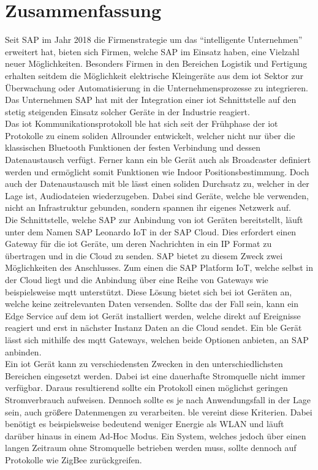 \section{Zusammenfassung}
\label{s:fazit}

\noindent Seit SAP im Jahr 2018 die Firmenstrategie um das "`intelligente Unternehmen"' erweitert hat, bieten sich Firmen, welche SAP im Einsatz haben, eine Vielzahl neuer Möglichkeiten. Besonders Firmen in den Bereichen Logistik und Fertigung erhalten seitdem die Möglichkeit elektrische Kleingeräte aus dem \ac{iot} Sektor zur Überwachung oder Automatisierung in die Unternehmensprozesse zu integrieren. Das Unternehmen SAP hat mit der Integration einer \ac{iot} Schnittstelle auf den stetig steigenden Einsatz solcher Geräte in der Industrie reagiert.\\
\noindent Das \ac{iot} Kommunikationsprotokoll \ac{ble} hat sich seit der Frühphase der \ac{iot} Protokolle zu einem soliden Allrounder entwickelt, welcher nicht nur über die klassischen Bluetooth Funktionen der festen Verbindung und dessen Datenaustausch verfügt. Ferner kann ein \ac{ble} Gerät auch als Broadcaster definiert werden und ermöglicht somit Funktionen wie Indoor Positionsbestimmung. Doch auch der Datenaustausch mit \ac{ble} lässt einen soliden Durchsatz zu, welcher in der Lage ist, Audiodateien wiederzugeben. Dabei sind Geräte, welche \ac{ble} verwenden, nicht an Infrastruktur gebunden, sondern spannen ihr eigenes Netzwerk auf.\\ 
\noindent Die Schnittstelle, welche SAP zur Anbindung von \ac{iot} Geräten bereitstellt, läuft unter dem Namen SAP Leonardo IoT in der SAP Cloud. Dies erfordert einen Gateway für die \ac{iot} Geräte, um deren Nachrichten in ein IP Format zu übertragen und in die Cloud zu senden. SAP bietet zu diesem Zweck zwei Möglichkeiten des Anschlusses. Zum einen die SAP Platform IoT, welche selbst in der Cloud liegt und die Anbindung über eine Reihe von Gateways wie beispielsweise \ac{mqtt} unterstützt. Diese Lösung bietet sich bei \ac{iot} Geräten an, welche keine zeitrelevanten Daten versenden. Sollte das der Fall sein, kann ein Edge Service auf dem \ac{iot} Gerät installiert werden, welche direkt auf Ereignisse reagiert und erst in nächster Instanz Daten an die Cloud sendet. Ein \ac{ble} Gerät lässt sich mithilfe des \ac{mqtt} Gateways, welchen beide Optionen anbieten, an SAP anbinden.\\    
\noindent Ein \ac{iot} Gerät kann zu verschiedensten Zwecken in den unterschiedlichsten Bereichen eingesetzt werden. Dabei ist eine dauerhafte Stromquelle nicht immer verfügbar. Daraus resultierend sollte ein Protokoll einen möglichst geringen Stromverbrauch aufweisen. Dennoch sollte es je nach Anwendungsfall in der Lage sein, auch größere Datenmengen zu verarbeiten. \ac{ble} vereint diese Kriterien. Dabei benötigt es beispielsweise bedeutend weniger Energie als WLAN und läuft darüber hinaus in einem Ad-Hoc Modus. Ein System, welches jedoch über einen langen Zeitraum ohne Stromquelle betrieben werden muss, sollte dennoch auf Protokolle wie ZigBee zurückgreifen.\\      
  
